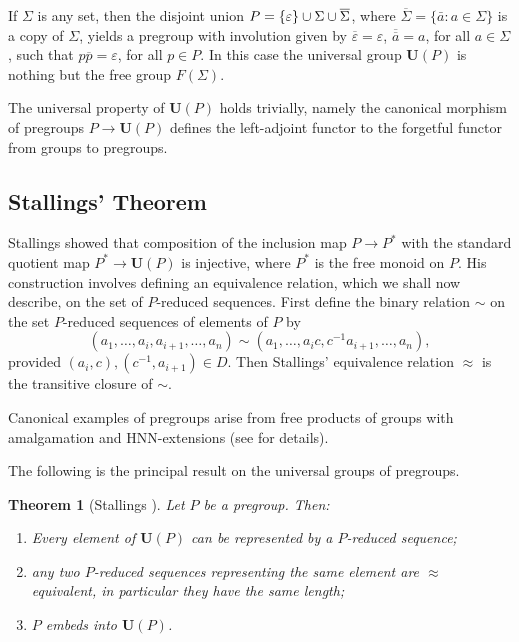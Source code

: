 \documentclass[a4paper]{article}
\newcommand\ov[1]{\overline{#1}} %
\newcommand\eps{\varepsilon}
\newcommand{\Uvec}{\mathbf{U}}	%
\newcommand{\UP}{\Uvec(P)}
\newcommand{\smallset}[1]{\left\{\mathinner{#1}\right\}}
\theoremstyle{plain}
\newtheorem{theorem}{Theorem}[section]
\theoremstyle{definition}
\begin{document}
If ${\Sigma}$ is any set, then
the disjoint union $P= \smallset{\eps} \cup \Sigma \cup \ov{\Sigma}$, 
where $\ov{\Sigma}=\{\bar a:a\in \Sigma\}$ is a copy of ${\Sigma}$, 
yields a pregroup with involution given by $\ov \eps=\eps$, $\ov{\ov{a}}=a$,
for all $a\in \Sigma$,  such that $p \ov{p} = \eps$,
for all $p\in P$.
In this case the universal
group $\UP$ is nothing but the free group $F(\Sigma)$.

The universal property of $\UP$ holds trivially, namely
the canonical morphism of pregroups $P \to \UP$ defines the
left-adjoint functor to the {forgetful}
functor from groups to pregroups.

\subsection{Stallings' Theorem}\label{sec:stall}
Stallings \cite{Stallings_1971} showed that composition of the
inclusion map $P \rightarrow P^\ast$
 with the standard quotient map $P^\ast \rightarrow \UP$ is injective,
where $P^\ast$ is the free monoid on $P$. His construction involves defining
an equivalence relation, which we shall now describe, on the set of 
$P$-reduced sequences.
First define the binary relation  $\sim$ on the set $P$-reduced sequences of elements
of $P$ by
$$(a_1,\ldots, a_i,a_{i+1},\ldots, a_n)\sim
(a_1,\ldots ,a_ic,c^{-1}a_{i+1},\ldots, a_n),$$
provided  $(a_i,c),(c^{-1},a_{i+1}) \in D.$
Then Stallings' equivalence relation $\approx$ is the transitive closure of $\sim$.

Canonical examples of pregroups arise from free products of groups with
amalgamation and HNN-extensions (see \cite{DiekertDuncanMiasnikov_2010} for details).


The following is the principal result on the universal groups of pregroups.

\begin{theorem} [Stallings \cite{Stallings_1971}]\label{thm:sup}
Let $P$ be a pregroup. Then:
\begin{enumerate}[1)]
\item Every element of $\UP$ can be  represented by
a $P$-reduced sequence;
\item  any two $P$-reduced sequences representing
the same element are $\approx$ equivalent, in particular they have the same length;\label{it:sup2}
\item $P$ embeds into  $\UP$.
\end{enumerate}
 \end{theorem}
\end{document}

